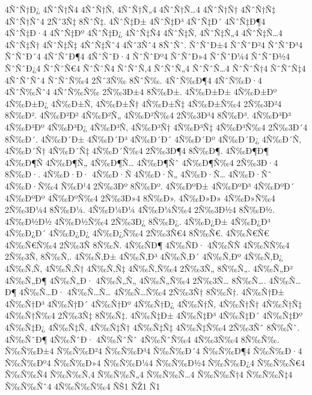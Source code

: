 {4ÑˆÑ†Ð¿
4ÑˆÑ†Ñ4
4ÑˆÑ†Ñ‚
4ÑˆÑ†Ñ„4
4ÑˆÑ†Ñ…4
4ÑˆÑ†Ñ†
4ÑˆÑ†Ñ‡
4ÑˆÑ†Ñˆ4
2Ñˆ3Ñ‡
8ÑˆÑ‡.
4ÑˆÑ‡Ð±
4ÑˆÑ‡Ð³
4ÑˆÑ‡Ð´
4ÑˆÑ‡Ð¶4
4ÑˆÑ‡Ð·4
4ÑˆÑ‡Ðº
4ÑˆÑ‡Ð¿
4ÑˆÑ‡Ñ4
4ÑˆÑ‡Ñ‚
4ÑˆÑ‡Ñ„4
4ÑˆÑ‡Ñ…4
4ÑˆÑ‡Ñ†
4ÑˆÑ‡Ñ‡
4ÑˆÑ‡Ñˆ4
4Ñˆ3Ñˆ4
8ÑˆÑˆ.
ÑˆÑˆÐ±4
ÑˆÑˆÐ²4
ÑˆÑˆÐ³4
ÑˆÑˆÐ´4
4ÑˆÑˆÐ¶4
4ÑˆÑˆÐ·4
ÑˆÑˆÐº4
ÑˆÑˆÐ»4
ÑˆÑˆÐ¼4
ÑˆÑˆÐ½4
ÑˆÑˆÐ¿4
ÑˆÑˆÑ€4
ÑˆÑˆÑ4
ÑˆÑˆÑ‚4
ÑˆÑˆÑ„4
ÑˆÑˆÑ…4
ÑˆÑˆÑ†4
ÑˆÑˆÑ‡4
4ÑˆÑˆÑˆ4
ÑˆÑˆÑ‰4
2Ñˆ3Ñ‰
8ÑˆÑ‰.
4ÑˆÑ‰Ð¶4
4ÑˆÑ‰Ð·4
4ÑˆÑ‰Ñˆ4
4ÑˆÑ‰Ñ‰
2Ñ‰3Ð±4
8Ñ‰Ð±.
4Ñ‰Ð±Ð±
4Ñ‰Ð±Ðº
4Ñ‰Ð±Ð¿
4Ñ‰Ð±Ñ‚
4Ñ‰Ð±Ñ†
4Ñ‰Ð±Ñ‡
4Ñ‰Ð±Ñ‰4
2Ñ‰3Ð²4
8Ñ‰Ð².
4Ñ‰Ð²Ð²
4Ñ‰Ð²Ñ„
4Ñ‰Ð²Ñ‰4
2Ñ‰3Ð³4
8Ñ‰Ð³.
4Ñ‰Ð³Ð³
4Ñ‰Ð³Ðº
4Ñ‰Ð³Ð¿
4Ñ‰Ð³Ñ‚
4Ñ‰Ð³Ñ†
4Ñ‰Ð³Ñ‡
4Ñ‰Ð³Ñ‰4
2Ñ‰3Ð´4
8Ñ‰Ð´.
4Ñ‰Ð´Ð±
4Ñ‰Ð´Ð³
4Ñ‰Ð´Ð´
4Ñ‰Ð´Ðº
4Ñ‰Ð´Ð¿
4Ñ‰Ð´Ñ‚
4Ñ‰Ð´Ñ†
4Ñ‰Ð´Ñ‡
4Ñ‰Ð´Ñ‰4
2Ñ‰3Ð¶4
8Ñ‰Ð¶.
4Ñ‰Ð¶Ð¶
4Ñ‰Ð¶Ñ
4Ñ‰Ð¶Ñ„
4Ñ‰Ð¶Ñ…
4Ñ‰Ð¶Ñˆ
4Ñ‰Ð¶Ñ‰4
2Ñ‰3Ð·4
8Ñ‰Ð·.
4Ñ‰Ð·Ð·
4Ñ‰Ð·Ñ
4Ñ‰Ð·Ñ„
4Ñ‰Ð·Ñ…
4Ñ‰Ð·Ñˆ
4Ñ‰Ð·Ñ‰4
Ñ‰Ð¹4
2Ñ‰3Ðº
8Ñ‰Ðº.
4Ñ‰ÐºÐ±
4Ñ‰ÐºÐ³
4Ñ‰ÐºÐ´
4Ñ‰ÐºÐº
4Ñ‰ÐºÑ‰4
2Ñ‰3Ð»4
8Ñ‰Ð».
4Ñ‰Ð»Ð»
4Ñ‰Ð»Ñ‰4
2Ñ‰3Ð¼4
8Ñ‰Ð¼.
4Ñ‰Ð¼Ð¼
4Ñ‰Ð¼Ñ‰4
2Ñ‰3Ð½4
8Ñ‰Ð½.
4Ñ‰Ð½Ð½
4Ñ‰Ð½Ñ‰4
2Ñ‰3Ð¿
8Ñ‰Ð¿.
4Ñ‰Ð¿Ð±
4Ñ‰Ð¿Ð³
4Ñ‰Ð¿Ð´
4Ñ‰Ð¿Ð¿
4Ñ‰Ð¿Ñ‰4
2Ñ‰3Ñ€4
8Ñ‰Ñ€.
4Ñ‰Ñ€Ñ€
4Ñ‰Ñ€Ñ‰4
2Ñ‰3Ñ
8Ñ‰Ñ.
4Ñ‰ÑÐ¶
4Ñ‰ÑÐ·
4Ñ‰ÑÑ
4Ñ‰ÑÑ‰4
2Ñ‰3Ñ‚
8Ñ‰Ñ‚.
4Ñ‰Ñ‚Ð±
4Ñ‰Ñ‚Ð³
4Ñ‰Ñ‚Ð´
4Ñ‰Ñ‚Ðº
4Ñ‰Ñ‚Ð¿
4Ñ‰Ñ‚Ñ‚
4Ñ‰Ñ‚Ñ†
4Ñ‰Ñ‚Ñ‡
4Ñ‰Ñ‚Ñ‰4
2Ñ‰3Ñ„
8Ñ‰Ñ„.
4Ñ‰Ñ„Ð²
4Ñ‰Ñ„Ð¶
4Ñ‰Ñ„Ð·
4Ñ‰Ñ„Ñ„
4Ñ‰Ñ„Ñ‰4
2Ñ‰3Ñ…
8Ñ‰Ñ….
4Ñ‰Ñ…Ð¶
4Ñ‰Ñ…Ð·
4Ñ‰Ñ…Ñ…
4Ñ‰Ñ…Ñ‰4
2Ñ‰3Ñ†
8Ñ‰Ñ†.
4Ñ‰Ñ†Ð±
4Ñ‰Ñ†Ð³
4Ñ‰Ñ†Ð´
4Ñ‰Ñ†Ðº
4Ñ‰Ñ†Ð¿
4Ñ‰Ñ†Ñ‚
4Ñ‰Ñ†Ñ†
4Ñ‰Ñ†Ñ‡
4Ñ‰Ñ†Ñ‰4
2Ñ‰3Ñ‡
8Ñ‰Ñ‡.
4Ñ‰Ñ‡Ð±
4Ñ‰Ñ‡Ð³
4Ñ‰Ñ‡Ð´
4Ñ‰Ñ‡Ðº
4Ñ‰Ñ‡Ð¿
4Ñ‰Ñ‡Ñ‚
4Ñ‰Ñ‡Ñ†
4Ñ‰Ñ‡Ñ‡
4Ñ‰Ñ‡Ñ‰4
2Ñ‰3Ñˆ
8Ñ‰Ñˆ.
4Ñ‰ÑˆÐ¶
4Ñ‰ÑˆÐ·
4Ñ‰ÑˆÑˆ
4Ñ‰ÑˆÑ‰4
4Ñ‰3Ñ‰4
8Ñ‰Ñ‰.
Ñ‰Ñ‰Ð±4
Ñ‰Ñ‰Ð²4
Ñ‰Ñ‰Ð³4
Ñ‰Ñ‰Ð´4
Ñ‰Ñ‰Ð¶4
Ñ‰Ñ‰Ð·4
Ñ‰Ñ‰Ðº4
Ñ‰Ñ‰Ð»4
Ñ‰Ñ‰Ð¼4
Ñ‰Ñ‰Ð½4
Ñ‰Ñ‰Ð¿4
Ñ‰Ñ‰Ñ€4
Ñ‰Ñ‰Ñ4
Ñ‰Ñ‰Ñ‚4
Ñ‰Ñ‰Ñ„4
Ñ‰Ñ‰Ñ…4
Ñ‰Ñ‰Ñ†4
Ñ‰Ñ‰Ñ‡4
Ñ‰Ñ‰Ñˆ4
4Ñ‰Ñ‰Ñ‰4
ÑŠ1
ÑŽ1
Ñ1
}

\endinput